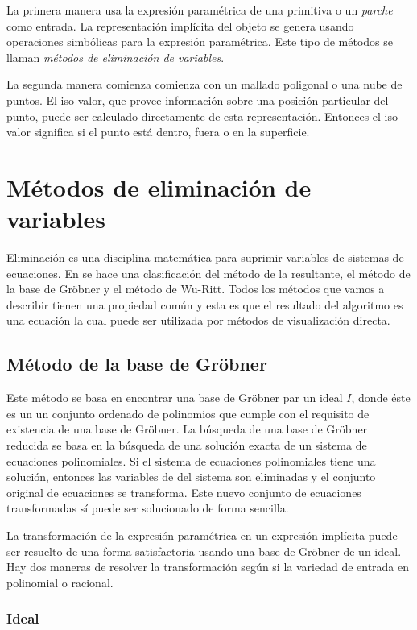 La primera manera usa la expresión paramétrica  de una primitiva o un { \em parche} como entrada. La representación implícita del objeto se genera usando operaciones simbólicas para la expresión paramétrica. Este tipo de métodos se llaman { \em métodos de eliminación de variables}.

La segunda manera comienza comienza con un mallado poligonal o una nube de puntos. El iso-valor, que provee información sobre una posición particular del punto, puede ser calculado directamente de esta representación. Entonces el iso-valor significa si el punto está dentro, fuera o en la superficie.

\section{Métodos de eliminación de variables}

Eliminación es una disciplina matemática para suprimir variables de sistemas de ecuaciones. En \cite{Hoffmann93} se hace una clasificación del método de la resultante, el método de la base de Gröbner y el método de Wu-Ritt. Todos los métodos que vamos a describir tienen una propiedad común y esta es que el resultado del algoritmo es una ecuación la cual puede ser utilizada por métodos de visualización directa.

\subsection{Método de la base de Gröbner}

Este método se basa en encontrar una base de Gröbner par un ideal $I$, donde éste es un un conjunto ordenado de polinomios que cumple con el requisito de existencia de una base de Gröbner. La búsqueda  de una base de Gröbner reducida se basa en la búsqueda de una solución exacta de un sistema de ecuaciones polinomiales. Si el sistema de ecuaciones polinomiales tiene una solución, entonces las variables de del sistema son eliminadas y el conjunto original de ecuaciones se transforma. Este nuevo conjunto de ecuaciones transformadas sí puede ser solucionado de forma sencilla.

La transformación de la expresión paramétrica en un expresión implícita puede ser resuelto de una forma satisfactoria usando una base de Gröbner de un ideal. Hay dos maneras de resolver la transformación según si la variedad de entrada en polinomial o racional.

\subsubsection*{Ideal}

